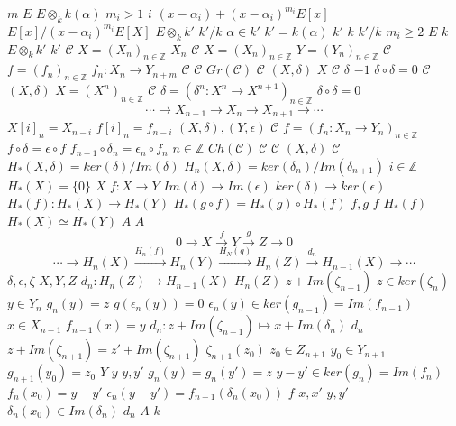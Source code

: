 \documentclass{article}
\begin{document}
$m$
$E$
$E \otimes_k k(\alpha)$
$m_i>1$
$i$
$(x-\alpha_i)+(x-\alpha_i)^{m_i}E[x]$
$E[x]/(x-\alpha_i)^{m_i}E[X]$
$E \otimes_k k'$
$k'/k$
$\alpha \in k'$
$k'=k(\alpha)$
$k'$
$k$
$k'/k$
$m_i \geq 2$
$E$
$k$
$E \otimes_k k'$
$k'$
$\mathcal{C}$
$X=(X_n)_{n \in \mathbb{Z}}$
$X_n$
$\mathcal{C}$
$X=(X_n)_{n \in \mathbb{Z}}$
$Y=(Y_n)_{n \in \mathbb{Z}}$
$\mathcal{C}$
$f=(f_n)_{n \in \mathbb{Z}}$
$f_n: X_n \rightarrow Y_{n+m}$
$\mathcal{C}$
$\mathcal{C}$
$Gr(\mathcal{C})$
$\mathcal{C}$
$(X,\delta)$
$X$
$\mathcal{C}$
$\delta$
$-1$
$\delta \circ \delta=0$
$\mathcal{C}$
$(X,\delta)$
$X=(X^n)_{n \in \mathbb{Z}}$
$\mathcal{C}$
$\delta=(\delta^n:X^n \rightarrow X^{n+1})_{n \in \mathbb{Z}}$
$\delta \circ \delta=0$
$$ \cdots \longrightarrow X_{n-1} \longrightarrow X_n \longrightarrow X_{n+1} \longrightarrow \cdots$$
$X[i]_n=X_{n-i}$
$f[i]_n=f_{n-i}$
$(X,\delta),(Y,\epsilon)$
$\mathcal{C}$
$f=(f_n:X_n \rightarrow Y_n)_{n \in \mathbb{Z}}$
$f \circ \delta =\epsilon \circ f$
$f_{n-1} \circ \delta_n=\epsilon_n \circ f_n$
$n \in \mathbb{Z}$
$Ch(\mathcal{C})$
$\mathcal{C}$
$\mathcal{C}$
$(X,\delta)$
$\mathcal{C}$
$H_*(X,\delta)=ker(\delta)/Im(\delta)$
$H_n(X,\delta)=ker(\delta_n)/Im(\delta_{n+1})$
$i \in \mathbb{Z}$
$H_*(X)=\{0\}$
$X$
$f:X \rightarrow Y$
$Im(\delta) \rightarrow Im(\epsilon)$
$ker(\delta) \rightarrow ker(\epsilon)$
$H_*(f):H_*(X) \rightarrow H_*(Y)$
$H_*(g \circ f)=H_*(g) \circ H_*(f)$
$f,g$
$f$
$H_*(f)$
$H_*(X) \simeq H_*(Y)$
$A$
$A$
$$0 \longrightarrow X \stackrel{f}{\longrightarrow} Y \stackrel{g}{\longrightarrow} Z \longrightarrow 0$$
$$ \cdots \longrightarrow H_n(X) \stackrel{H_n(f)}{\longrightarrow} H_n(Y) \stackrel{H_N(g)}{\longrightarrow} H_n(Z) \stackrel{d_n}{\longrightarrow} H_{n-1}(X) \longrightarrow \cdots$$
$\delta,\epsilon,\zeta$
$X,Y,Z$
$d_n:H_n(Z) \rightarrow H_{n-1}(X)$
$H_n(Z)$
$z+Im(\zeta_{n+1})$
$z \in ker(\zeta_n)$
$y \in Y_n$
$g_n(y)=z$
$g(\epsilon_n(y))=0$
$\epsilon_n(y) \in ker(g_{n-1})=Im(f_{n-1})$
$x \in X_{n-1}$
$f_{n-1}(x)=y$
$d_n:z+Im(\zeta_{n+1}) \mapsto x+Im(\delta_{n})$
$d_n$
$z+Im(\zeta_{n+1})=z'+Im(\zeta_{n+1})$
$\zeta_{n+1}(z_0)$
$z_0 \in Z_{n+1}$
$y_0 \in Y_{n+1}$
$g_{n+1}(y_0)=z_0$
$Y$
$y$
$y,y'$
$g_n(y)=g_n(y')=z$
$y-y' \in ker(g_n)=Im(f_n)$
$f_n(x_0)=y-y'$
$\epsilon_n(y-y')=f_{n-1}(\delta_{n}(x_0))$
$f$
$x,x'$
$y,y'$
$\delta_n(x_0) \in Im(\delta_n)$
$d_n$
$A$
$k$
\end{document}
